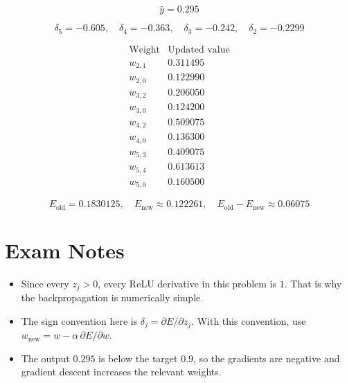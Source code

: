 \documentclass[11pt]{article}
\begin{document}
\[
\boxed{\hat{y}=0.295}
\]

\[
\boxed{
\delta_5=-0.605,\quad
\delta_4=-0.363,\quad
\delta_3=-0.242,\quad
\delta_2=-0.2299
}
\]

\[
\boxed{
\begin{array}{c|c}
\text{Weight} & \text{Updated value} \\
\hline
w_{2,1} & 0.311495 \\
w_{2,0} & 0.122990 \\
w_{3,2} & 0.206050 \\
w_{3,0} & 0.124200 \\
w_{4,2} & 0.509075 \\
w_{4,0} & 0.136300 \\
w_{5,3} & 0.409075 \\
w_{5,4} & 0.613613 \\
w_{5,0} & 0.160500
\end{array}
}
\]

\[
\boxed{
E_{\text{old}}=0.1830125,\quad
E_{\text{new}}\approx 0.122261,\quad
E_{\text{old}}-E_{\text{new}}\approx 0.06075
}
\]

\section*{Exam Notes}

\begin{itemize}
    \item Since every \(z_j>0\), every ReLU derivative in this problem is \(1\).
    That is why the backpropagation is numerically simple.
    \item The sign convention here is \(\delta_j=\partial E/\partial z_j\). With
    this convention, use \(w_{\text{new}}=w-\alpha\,\partial E/\partial w\).
    \item The output \(0.295\) is below the target \(0.9\), so the gradients are
    negative and gradient descent increases the relevant weights.
\end{itemize}
\end{document}
